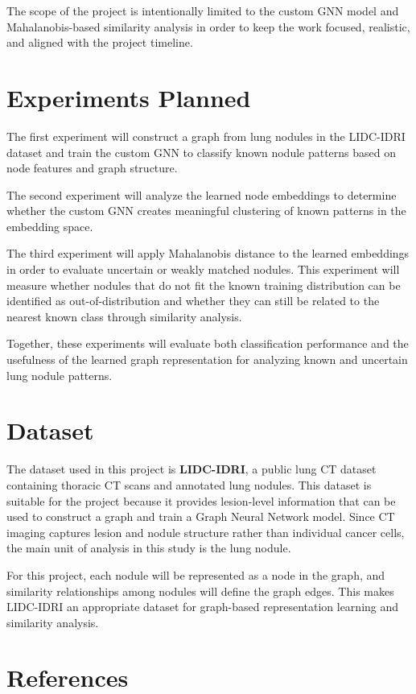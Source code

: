 \documentclass[12pt]{article}
\begin{document}
The scope of the project is intentionally limited to the custom GNN model and Mahalanobis-based similarity analysis in order to keep the work focused, realistic, and aligned with the project timeline.

\section*{Experiments Planned}

The first experiment will construct a graph from lung nodules in the LIDC-IDRI dataset and train the custom GNN to classify known nodule patterns based on node features and graph structure.

The second experiment will analyze the learned node embeddings to determine whether the custom GNN creates meaningful clustering of known patterns in the embedding space.

The third experiment will apply Mahalanobis distance to the learned embeddings in order to evaluate uncertain or weakly matched nodules. This experiment will measure whether nodules that do not fit the known training distribution can be identified as out-of-distribution and whether they can still be related to the nearest known class through similarity analysis.

Together, these experiments will evaluate both classification performance and the usefulness of the learned graph representation for analyzing known and uncertain lung nodule patterns.

\section*{Dataset}

The dataset used in this project is \textbf{LIDC-IDRI}, a public lung CT dataset containing thoracic CT scans and annotated lung nodules. This dataset is suitable for the project because it provides lesion-level information that can be used to construct a graph and train a Graph Neural Network model. Since CT imaging captures lesion and nodule structure rather than individual cancer cells, the main unit of analysis in this study is the lung nodule.

For this project, each nodule will be represented as a node in the graph, and similarity relationships among nodules will define the graph edges. This makes LIDC-IDRI an appropriate dataset for graph-based representation learning and similarity analysis.

\section*{References}
\end{document}
